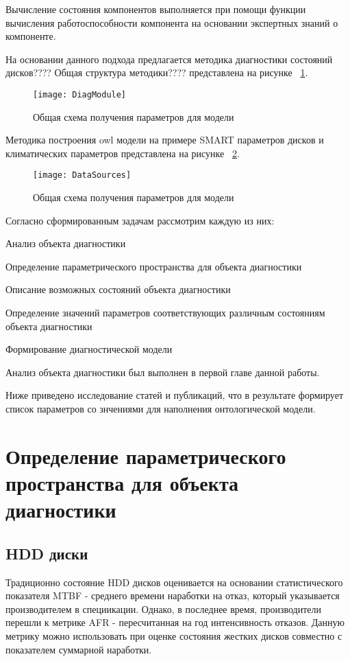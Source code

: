 Вычисление  состояния  компонентов  выполняется  при  помощи функции вычисления работоспособности компонента на основании экспертных знаний о компоненте.

На основании данного подхода предлагается методика диагностики состояний дисков????
Общая структура методики???? представлена на рисунке ~\ref{fig:DiagModule}.
\begin{figure}[h]
	\centering
	\texttt{[image: DiagModule]}
	\caption{Общая схема получения параметров для модели}
	\label{fig:DiagModule}
\end{figure}

Методика построения owl модели на примере SMART параметров дисков и климатических параметров представлена на рисунке ~\ref{fig:DataSources}.

\begin{figure}[h]
	\centering
	\texttt{[image: DataSources]}
	\caption{Общая схема получения параметров для модели}
	\label{fig:DataSources}
\end{figure}

Согласно сформированным задачам рассмотрим каждую из них: 
\begin{itemize*}
	\item{Анализ объекта диагностики}
	\item{Определение параметрического пространства для объекта диагностики}
	\item{Описание возможных состояний объекта диагностики}
	\item{Определение значений параметров соответствующих различным состояниям объекта диагностики}
	\item{Формирование диагностической модели}
\end{itemize*}

Анализ объекта диагностики был выполнен в первой главе данной работы. 

Ниже приведено исследование статей и публикаций, что в результате формирует список параметров со знчениями для наполнения онтологической модели.

\section{Определение параметрического пространства для объекта диагностики}

\subsection{HDD диски}
Традиционно состояние HDD дисков оценивается на основании статистического показателя MTBF - среднего времени наработки на отказ, который указывается производителем в специикации. Однако, в последнее время, производители перешли к метрике AFR - пересчитанная на год интенсивность отказов. Данную метрику можно использовать при оценке состояния жестких дисков совместно с показателем суммарной наработки.  

